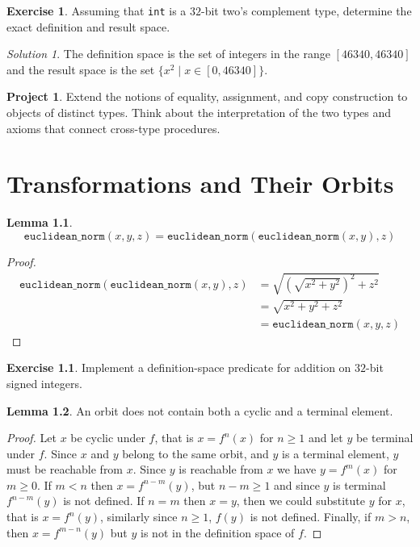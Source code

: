 \documentclass{report}
\theoremstyle{definition}
\newtheorem{lemma}{Lemma}[chapter]
\newtheorem{exercise}{Exercise}[chapter]
\newtheorem{project}{Project}[chapter]
\theoremstyle{remark}
\newtheorem*{solution}{Solution}
\begin{document}
\begin{exercise}
	Assuming that \verb|int| is a $32$-bit two's complement type, determine
	the exact definition and result space.
\end{exercise}

\begin{solution}
	The definition space is the set of integers in the range $[46340,
	46340]$ and the result space is the set $\{ x^2 \mid x \in [0, 46340]
	\}$.
\end{solution}

\begin{project}
	Extend the notions of equality, assignment, and copy construction to
	objects of distinct types. Think about the interpretation of the two
	types and axioms that connect cross-type procedures.
\end{project}

\chapter{Transformations and Their Orbits}

\begin{lemma}
	\[ \mathtt{euclidean\_norm}(x, y, z) = \mathtt{euclidean\_norm}(\mathtt{euclidean\_norm}(x, y), z) \]
\end{lemma}

\begin{proof}
	\begin{align*}
		\mathtt{euclidean\_norm}(\mathtt{euclidean\_norm}(x, y), z)
		&= \sqrt{\left (\sqrt{x^2 + y^2} \right )^2 + z^2}\\
		&= \sqrt{x^2 + y^2 + z^2}\\
		&= \mathtt{euclidean\_norm}(x, y, z)
	\end{align*}
\end{proof}

\begin{exercise}
	Implement a definition-space predicate for addition on $32$-bit signed
	integers.
\end{exercise}



\begin{lemma}
	An orbit does not contain both a cyclic and a terminal element.
\end{lemma}

\begin{proof}
	Let $x$ be cyclic under $f$, that is $x = f^n(x)$ for $n \geq 1$ and
	let $y$ be terminal under $f$. Since $x$ and $y$ belong to the same
	orbit, and $y$ is a terminal element, $y$ must be reachable from $x$.
	Since $y$ is reachable from $x$ we have $y = f^m(x)$ for $m \geq 0$.
	If $m < n$ then $x = f^{n - m}(y)$, but $n - m \geq 1$ and since $y$
	is terminal $f^{n - m}(y)$ is not defined. If $n = m$ then $x = y$,
	then we could substitute $y$ for $x$, that is $x = f^n(y)$, similarly
	since $n \geq 1$, $f(y)$ is not defined. Finally, if $m > n$, then
	$x = f^{m - n}(y)$ but $y$ is not in the definition space of $f$.
\end{proof}
\end{document}
